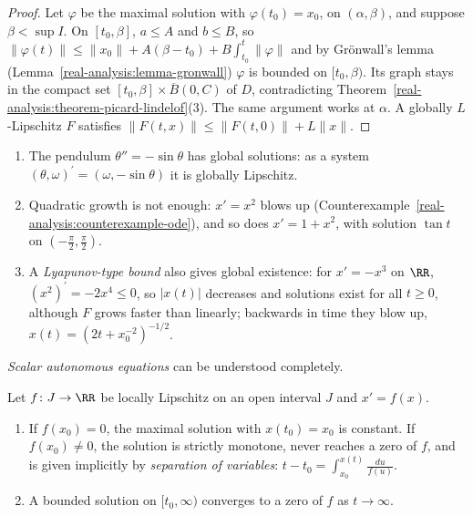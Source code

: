 \begin{proof}
Let $\varphi$ be the maximal solution with $\varphi(t_0) = x_0$, on $(\alpha, \beta)$, and suppose $\beta < \sup I$. On $[t_0, \beta]$, $a \leq A$ and $b \leq B$, so $\|\varphi(t)\| \leq \|x_0\| + A(\beta - t_0) + B\int_{t_0}^t\|\varphi\|$ and
by Gr\"onwall's lemma (Lemma~\ref{real-analysis:lemma-gronwall}) $\varphi$ is bounded on $[t_0, \beta)$. Its graph stays in the compact set $[t_0, \beta] \times \overline{B}(0, C)$ of $D$, contradicting
Theorem~\ref{real-analysis:theorem-picard-lindelof}(3). The same argument works at $\alpha$. A globally $L$-Lipschitz $F$ satisfies $\|F(t, x)\| \leq \|F(t, 0)\| + L\|x\|$.
\end{proof}

\begin{example}\label{ordinary-differential-equations:example-global}
\begin{enumerate}
\item The pendulum $\theta'' = -\sin\theta$ has global solutions: as a system $(\theta, \omega)^{\prime} = (\omega, -\sin\theta)$ it is globally Lipschitz.
\item Quadratic growth is not enough: $x' = x^2$ blows up (Counterexample~\ref{real-analysis:counterexample-ode}), and so does $x' = 1 + x^2$, with solution $\tan t$ on $(-\frac\pi2, \frac\pi2)$.
\item A \emph{Lyapunov-type bound} also gives global existence: for $x' = -x^3$ on $\RR$, $(x^2)^{\prime} = -2x^4 \leq 0$, so $|x(t)|$ decreases and solutions exist for all $t \geq 0$, although $F$ grows faster than linearly; backwards in time
they blow up, $x(t) = (2t + x_0^{-2})^{-1/2}$.
\end{enumerate}
\end{example}

\emph{Scalar autonomous equations} can be understood completely.

\begin{proposition}\label{ordinary-differential-equations:proposition-scalar-autonomous}
Let $f \colon J \to \RR$ be locally Lipschitz on an open interval $J$ and $x' = f(x)$.
\begin{enumerate}
\item If $f(x_0) = 0$, the maximal solution with $x(t_0) = x_0$ is constant. If $f(x_0) \neq 0$, the solution is strictly monotone, never reaches a zero of $f$, and is given implicitly by \emph{separation of variables}:
$t - t_0 = \int_{x_0}^{x(t)}\frac{du}{f(u)}$.
\item A bounded solution on $[t_0, \infty)$ converges to a zero of $f$ as $t \to \infty$.
\end{enumerate}
\end{proposition}

